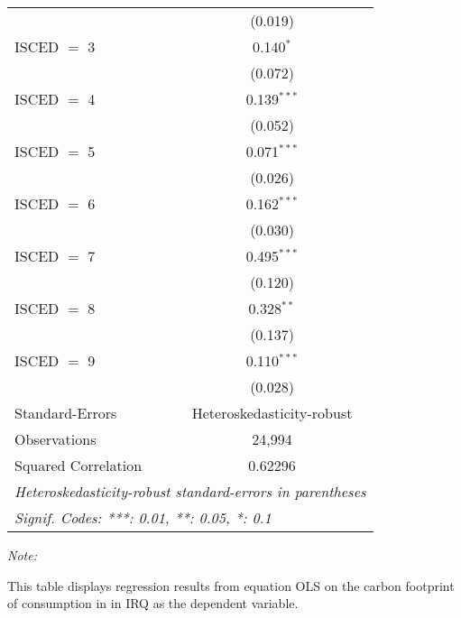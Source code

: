 \begin{table}[htbp!]
\begin{adjustbox}{width = 1\textwidth, max height = 0.95\textheight, center}
\begin{threeparttable}[b]
\begin{tabular}{lc}
                                & (0.019)\\   
            ISCED $=$ 3         & 0.140$^{*}$\\   
                                & (0.072)\\   
            ISCED $=$ 4         & 0.139$^{***}$\\   
                                & (0.052)\\   
            ISCED $=$ 5         & 0.071$^{***}$\\   
                                & (0.026)\\   
            ISCED $=$ 6         & 0.162$^{***}$\\   
                                & (0.030)\\   
            ISCED $=$ 7         & 0.495$^{***}$\\   
                                & (0.120)\\   
            ISCED $=$ 8         & 0.328$^{**}$\\   
                                & (0.137)\\   
            ISCED $=$ 9         & 0.110$^{***}$\\   
                                & (0.028)\\   
            \midrule 
            Standard-Errors     & Heteroskedasticity-robust \\   
            Observations        & 24,994\\  
            Squared Correlation & 0.62296\\  
            \midrule \midrule
            \multicolumn{2}{l}{\emph{Heteroskedasticity-robust standard-errors in parentheses}}\\
            \multicolumn{2}{l}{\emph{Signif. Codes: ***: 0.01, **: 0.05, *: 0.1}}\\
         \end{tabular}
         
         \begin{tablenotes}\item \medskip \textit{Note:}
            \item This table displays regression results from equation OLS on the carbon footprint of consumption in  in IRQ as the dependent variable.  
         \end{tablenotes}
      \end{threeparttable}
   \end{adjustbox}
\end{table}


